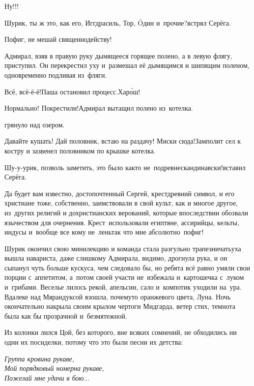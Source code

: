 \diagdash Ну!!!

\diagdash Шурик, ты ж это, как его, Иггдрасиль, Тор, {\'{O}}дин и~прочие?\mdash встрял Серёга.

\diagdash Пофиг, не мешай священнодейству!

Адмирал, взяв в правую руку дымящееся горящее полено, а в левую флягу, приступил. Он перекрестил уху и~размешал её дымящимся и шипящим поленом, одновременно подливая из~фляги.

\diagdash Всё, всё-ё-ё!\mdash Паша остановил процесс.\mdash Хар{\'о}ш!

\diagdash Нормально! Покрестили!\mdash Адмирал вытащил полено из~котелка.

\mdash грянуло над озером.

\diagdash Давайте кушать! Дай половник, встаю на раздачу! Миски сюда!\mdash Замполит сел к костру и зазвенел половником по крышке котелка.

\diagdash Шу-у-урик, позволь заметить, это было как\sdash то не~по\sdash древнескандинавски!\mdash вставил Серёга.

\diagdash Да будет вам известно, достопочтенный Сергей, крест\mdash древний символ, и его христиане тоже, собственно, заимствовали в свой культ, как и многое другое, из~других религий и дохристианских верований, которые впоследствии обозвали язычеством для очернения. Крест~использовали египтяне, ассирийцы, кельты, индусы и~вообще все кому не~лень\mdash так что мне абсолютно~пофиг! 

Шурик окончил свою мини\sdash лекцию и команда стала разгульно трапезничать\mdash уха вышла навариста, даже слишком\mdash у Адмирала, видимо, дрогнула рука, и он сыпанул чуть больше кус\sdash куса, чем следовало бы, но ребята всё равно умяли свои порции с~аппетитом, а~потом своей участи не~избежала и~картошечка с~луком и~грибами. Веселье лилось рекой, апельсин, сало и~компотик уходили на~ура. Вдалеке над Мярандуксой взошла, почему\sdash то оранжевого цвета, Луна. Ночь окончательно накрыла своим крылом чертоги Мидгарда, ветер стих, темнота была как бы прозрачной и~безмятежной.

Из колонки лился Цой, без которого, вне всяких сомнений, не обходились ни одни их посиделки, потому что это были песни их детства:

\vspace{0.1cm}
\noindent\textit{%
	\hspace*{2.5cm}Группа крови\mdash на рукаве,\\	
	\hspace*{2.5cm}Мой порядковый номер\mdash на рукаве,\\
	\hspace*{2.5cm}Пожелай мне удачи в бою$\ldots$%
}

